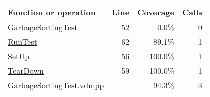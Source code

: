 \bigskip
\begin{longtable}{|l|r|r|r|}
\hline
Function or operation & Line & Coverage & Calls \\
\hline
\hline
\hyperref[GarbageSortingTest:52]{GarbageSortingTest} & 52&0.0\% & 0 \\
\hline
\hyperref[RunTest:62]{RunTest} & 62&89.1\% & 1 \\
\hline
\hyperref[SetUp:56]{SetUp} & 56&100.0\% & 1 \\
\hline
\hyperref[TearDown:59]{TearDown} & 59&100.0\% & 1 \\
\hline
\hline
GarbageSortingTest.vdmpp & & 94.3\% & 3 \\
\hline
\end{longtable}

